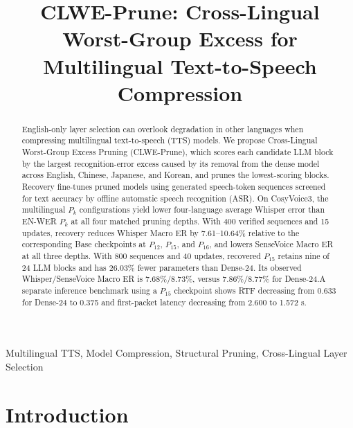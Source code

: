 \documentclass{article}
\title{CLWE-Prune: Cross-Lingual Worst-Group Excess for Multilingual Text-to-Speech Compression}
\begin{document}
\ninept
%
\maketitle

\begingroup
\renewcommand{\thefootnote}{\fnsymbol{footnote}}
\endgroup
%
\begin{abstract}
English-only layer selection can overlook degradation in other
languages when compressing multilingual text-to-speech (TTS) models.
We propose Cross-Lingual Worst-Group Excess Pruning (CLWE-Prune),
which scores each candidate LLM block by the largest recognition-error
excess caused by its removal from the dense model across English,
Chinese, Japanese, and Korean, and prunes the lowest-scoring blocks.
Recovery fine-tunes pruned models using generated speech-token
sequences screened for text accuracy by offline automatic speech
recognition (ASR). On CosyVoice3, the multilingual \(P_k\)
configurations yield lower four-language average Whisper error than
EN-WER \(P_k\) at all four matched pruning depths. With 400 verified
sequences and 15 updates, recovery reduces Whisper Macro ER by
7.61--10.64\% relative to the corresponding Base checkpoints at
\(P_{12}\), \(P_{15}\), and \(P_{16}\), and lowers SenseVoice Macro ER
at all three depths. With 800 sequences and 40 updates, recovered
\(P_{15}\) retains nine of 24 LLM blocks and has 26.03\% fewer
parameters than Dense-24. Its observed Whisper/SenseVoice Macro ER
is 7.68\%/8.73\%, versus 7.86\%/8.77\% for Dense-24.A separate inference benchmark using a \(P_{15}\) checkpoint shows
RTF decreasing from 0.633 for Dense-24 to 0.375 and first-packet
latency decreasing from 2.600 to 1.572 s.
\end{abstract}
%
\begin{keywords}
Multilingual TTS, Model Compression, Structural Pruning, Cross-Lingual Layer Selection
\end{keywords}
%

\section{Introduction}
\label{sec:intro}
\end{document}
